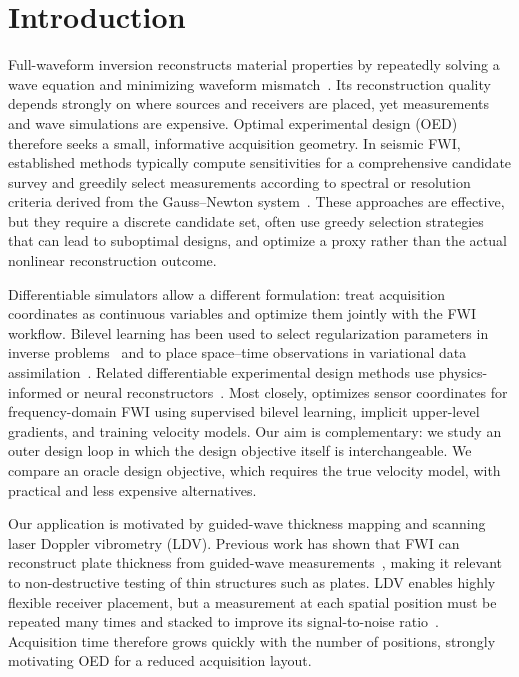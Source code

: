 \section{Introduction}

Full-waveform inversion reconstructs material properties by repeatedly solving a wave equation and minimizing waveform mismatch~\citep{virieux2009overview}. Its reconstruction quality depends strongly on where sources and receivers are placed, yet measurements and wave simulations are expensive. Optimal experimental design (OED) therefore seeks a small, informative acquisition geometry. In seismic FWI, established methods typically compute sensitivities for a comprehensive candidate survey and greedily select measurements according to spectral or resolution criteria derived from the Gauss--Newton system~\citep{maurer2017oed,krampe2021oed,mercier2025combined}. These approaches are effective, but they require a discrete candidate set, often use greedy selection strategies that can lead to suboptimal designs, and optimize a proxy rather than the actual nonlinear reconstruction outcome.

Differentiable simulators allow a different formulation: treat acquisition
coordinates as continuous variables and optimize them jointly with the FWI workflow. Bilevel learning has been used to select
regularization parameters in inverse problems~\citep{holler2018bilevel} and to
place space--time observations in variational data
assimilation~\citep{castro2020observation}. Related differentiable experimental
design methods use physics-informed or neural
reconstructors~\citep{hemachandra2025pied,darges2025node,liu2025dspo}. Most
closely, \citet{downing2026bilevel} optimizes sensor coordinates for
frequency-domain FWI using supervised bilevel learning, implicit upper-level
gradients, and training velocity models. Our aim is complementary: we study an outer design loop in which the design objective itself is
interchangeable. We compare an oracle design objective, which requires the true velocity model, with practical and less expensive alternatives.


Our application is motivated by guided-wave thickness mapping and scanning laser
Doppler vibrometry (LDV). Previous work has shown that FWI can reconstruct plate thickness from guided-wave measurements~\citep{zuo2022quantitative}, making it relevant to non-destructive testing of thin structures such as plates. LDV enables
highly flexible receiver placement, but a measurement at each spatial position must be repeated many times and stacked to improve its signal-to-noise ratio~\citep{Thomsen2024}.
Acquisition time therefore grows quickly with the number of positions, strongly motivating OED for a reduced acquisition
layout.

